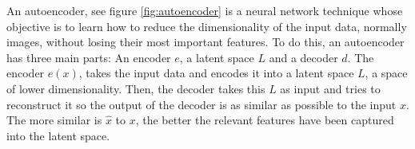 An autoencoder, see figure \ref{fig:autoencoder} is a neural network technique whose objective is to learn how to reduce the dimensionality of the input data, normally images, without losing their most important features. To do this, an autoencoder has three main parts: An encoder $e$, a latent space $L$ and a decoder $d$. The encoder $e(x)$, takes the input data and encodes it into a latent space $L$, a space of lower dimensionality. Then, the decoder takes this $L$ as input and tries to reconstruct it so the output of the decoder is as similar as possible to the input $x$. The more similar is $\hat{x}$ to $x$, the better the relevant features have been captured into the latent space.

